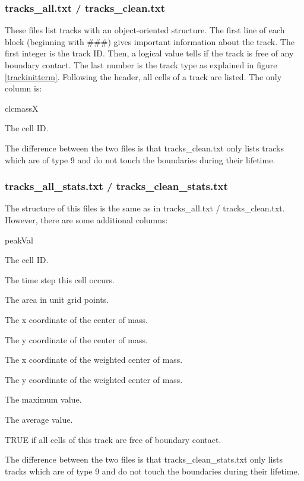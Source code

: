\documentclass{scrartcl}
\begin{document}
\subsubsection{tracks\_all.txt / tracks\_clean.txt}
These files list tracks with an object-oriented structure. The first line of each block (beginning with \#\#\#) gives important information about the track. The first integer is the track ID. Then, a logical value tells if the track is free of any boundary contact. The last number is the track type as explained in figure \ref{trackinitterm}. Following the header, all cells of a track are listed. The only column is:
\begin{labeling}{clcmassX}
	\item[clID] The cell ID.
\end{labeling}
The difference between the two files is that tracks\_clean.txt only lists tracks which are of type 9 and do not touch the boundaries during their lifetime. 

\subsubsection{tracks\_all\_stats.txt / tracks\_clean\_stats.txt}
The structure of this files is the same as in tracks\_all.txt / tracks\_clean.txt. However, there are some additional columns:
\begin{labeling}{peakVal}
	\item[clID] The cell ID.
	\item[tsclID] The time step this cell occurs.
	\item[clarea] The area in unit grid points.
	\item[clcmassX] The x coordinate of the center of mass.
	\item[clcmassY] The y coordinate of the center of mass.
	\item[wclcmassX] The x coordinate of the weighted center of mass.
	\item[wclcmassY] The y coordinate of the weighted center of mass.
	\item[peakVal] The maximum value.
	\item[avVal] The average value.
	\item[nobound] TRUE if all cells of this track are free of boundary contact.
\end{labeling}
The difference between the two files is that tracks\_clean\_stats.txt only lists tracks which are of type 9 and do not touch the boundaries during their lifetime.
\end{document}
